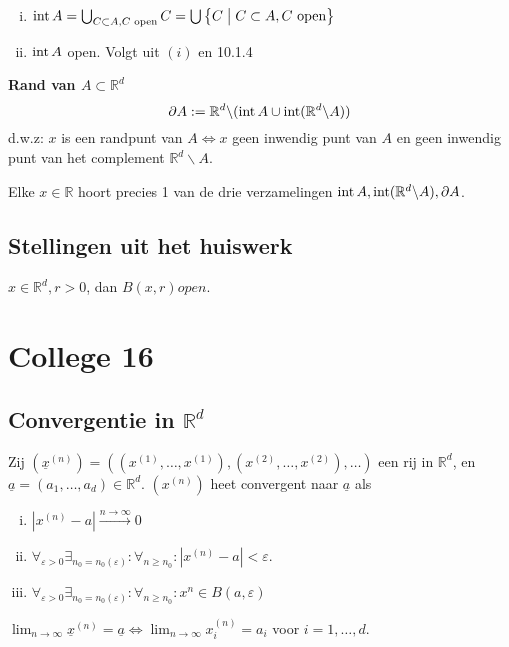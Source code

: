 \documentclass{2wa40summary}
\begin{document}
        \theorem
          \begin{enumerate}[(i)]
            \item $\operatorname{\mathop{int}} A=\bigcup_{C \subset A, C \text{ open} }C=\bigcup \big\{C \bigm| C \subset A, C \text{ open} \big\}$
            \item $\operatorname{\mathop{int}} A$ open. Volgt uit $(i)$ en 10.1.4
          \end{enumerate}

         \textbf{Rand van $A \subset \mathbb{R}^d$}
            \[\partial A:= \mathbb{R}^d\backslash (\operatorname{\mathop{int}} A \cup \operatorname{\mathop{int}} (\mathbb{R}^d\backslash A))\]
              d.w.z: $x$ is een randpunt van $A \Leftrightarrow x$ geen inwendig punt van $A$ en geen inwendig punt van het complement $\mathbb{R}^d\backslash A$.

        \lemma
        	Elke $x \in \mathbb{R}$ hoort precies 1 van de drie verzamelingen $\operatorname{\mathop{int}} A, \operatorname{\mathop{int}} (\mathbb{R}^d\backslash A), \partial A$.

  	\subsection{Stellingen uit het huiswerk}
        \theorem $x \in \mathbb{R}^d, r>0$, dan $B(x,r) open$.
\newpage
\section{College 16}
	\subsection{Convergentie in $\mathbb{R}^d$}
		 Zij $(\underline{x}^{(n)}) = ((x^{(1)},\dots ,x^{(1)}),(x^{(2)},\dots ,x^{(2)}),\dots )$ een rij in $\mathbb{R}^d$, en $\underline{a}=(a_1, \dots ,a_d ) \in \mathbb{R}^d$. $(x^{(n)}) $ heet convergent naar $\underline{a}$ als
			\begin{enumerate}[(i)]
				\item $|x^{(n)}-a|\stackrel{n\rightarrow \infty}{\longrightarrow} 0$
				\item $\forall _{\varepsilon >0} \exists _{n_0=n_0(\varepsilon)}: \forall _{n\geq n_0} : |x^{(n)} - a| < \varepsilon$.
				\item $\forall _{\varepsilon >0} \exists _{n_0=n_0(\varepsilon)}: \forall _{n\geq n_0} : x^n \in B(a,\varepsilon )$
			\end{enumerate}
		
		\theorem $\lim_{n\rightarrow\infty}\underline{x}^{(n)}=\underline{a} \Leftrightarrow \lim_{n\rightarrow\infty} x_{i}^{(n)} = a_i$ voor $i=1,\dots ,d$.
		
\end{document}
